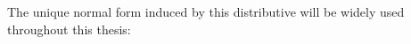 %
%
%
%


The unique normal form induced by this distributive will be widely used throughout this thesis:



